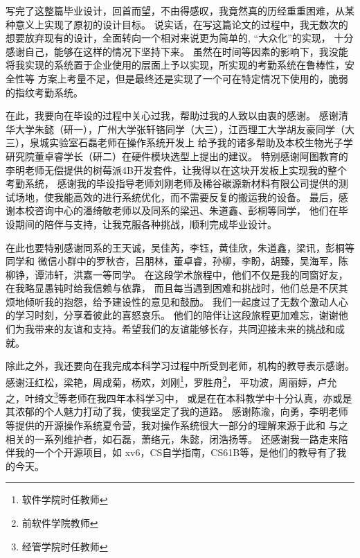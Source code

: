 
写完了这整篇毕业设计，回首而望，不由得感叹，我竟然真的历经重重困难，从某种意义上实现了原初的设计目标。
说实话，在写这篇论文的过程中，我无数次的想要放弃现有的设计，全面转向一个相对来说更为简单的, “大众化”的实现，
十分感谢自己，能够在这样的情况下坚持下来。
虽然在时间等因素的影响下，我没能将我实现的系统置于企业使用的层面上予以实现，所实现的考勤系统在鲁棒性，安全性等
方案上考量不足，但是最终还是实现了一个可在特定情况下使用的，脆弱的指纹考勤系统。

在此，我要向在毕设的过程中关心过我，帮助过我的人致以由衷的感谢。
感谢清华大学朱懿（研一），广州大学张轩铬同学（大三），江西理工大学胡友豪同学（大三），泉城实验室石磊老师在操作系统开发上
给予我的诸多帮助及本校生物光子学研究院董卓睿学长（研二）在硬件模块选型上提出的建议。
特别感谢阿图教育的李明老师无偿提供的树莓派4B开发套件，让我得以在这块开发板上实现我的整个考勤系统，
感谢我的毕设指导老师刘刚老师及稀谷碳源新材料有限公司提供的测试场地，使我能高效的进行系统优化，而不需要反复的搬运我的设备。
最后，感谢本校咨询中心的潘绮敏老师以及同系的梁迅、朱道鑫、彭桐等同学，
他们在毕设期间的陪伴与支持，让我克服各种挑战，顺利完成毕业设计。

在此也要特别感谢同系的王天诚，吴佳芮，李钰，黄佳欣，朱道鑫，梁讯，彭桐等同学和
微信小群中的罗秋杏，吕朋林，董卓睿，孙柳，李盼，胡臻，吴海军，陈柳铮，谭沛轩，洪嘉一等同学。
在这段学术旅程中，他们不仅是我的同窗好友，在我略显愚钝时给我信赖与依靠，
而且每当遇到困难和挑战时，他们总是不厌其烦地倾听我的抱怨，给予建设性的意见和鼓励。
我们一起度过了无数个激动人心的学习时刻，分享着彼此的喜怒哀乐。
他们的陪伴让这段旅程更加难忘，谢谢他们为我带来的友谊和支持。希望我们的友谊能够长存，共同迎接未来的挑战和成就。

除此之外，我还要向在我完成本科学习过程中所受到老师，机构的教导表示感谢。
感谢汪红松，梁艳，周成菊，杨欢，刘刚\footnote{软件学院时任教师}，罗胜舟\footnote{前软件学院教师}，
平功波，周丽婷，卢允之，叶绮文\footnote{经管学院时任教师}等老师在我四年本科学习中，
或是在在本科教学中十分认真，亦或是其浓郁的个人魅力打动了我，使我坚定了我的道路。
感谢陈渝，向勇，李明老师等提供的开源操作系统夏令营，我对操作系统很大一部分的理解来源于此和
与之相关的一系列维护者，如石磊，萧络元，朱懿，闭浩扬等。
还感谢我一路走来陪伴我的一个个开源项目，如 xv6，CS自学指南，CS61B等，是他们的教导有了我的今天。

